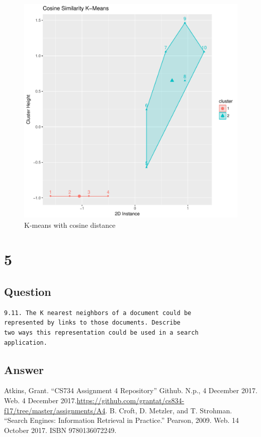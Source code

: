 \documentclass[letterpaper,11pt]{article}
\begin{document}
\begin{figure}[h]
\centering
\includegraphics[scale=0.5]{kmeans-cos.pdf}
\caption{K-means with cosine distance}
\label{fig:kmeans-cos}
\end{figure}

\clearpage


\section*{5}

\subsection*{Question}

\begin{verbatim}
9.11. The K nearest neighbors of a document could be 
represented by links to those documents. Describe 
two ways this representation could be used in a search
application.
\end{verbatim}

\subsection*{Answer}

\clearpage


\clearpage



\begin{thebibliography}{9}
Atkins, Grant. ``CS734 Assignment 4 Repository'' Github. N.p., 4 December 2017. Web. 4 December 2017.\url{https://github.com/grantat/cs834-f17/tree/master/assignments/A4}.
B. Croft, D. Metzler, and T. Strohman. ``Search Engines: Information Retrieval in Practice.'' Pearson, 2009. Web. 14 October 2017. ISBN 9780136072249.
\end{thebibliography}
\end{document}
